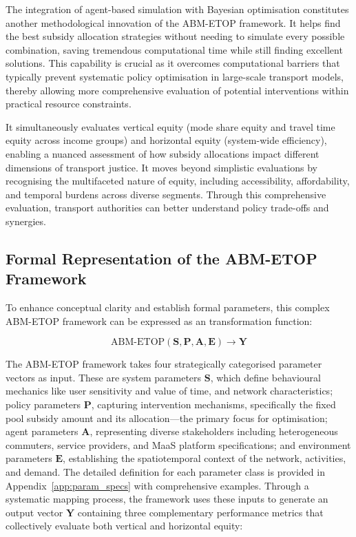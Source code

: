 \documentclass[a4paper,fleqn]{cas-sc}
\begin{document}
The integration of agent-based simulation with Bayesian optimisation constitutes another methodological innovation of the ABM-ETOP framework. It helps find the best subsidy allocation strategies without needing to simulate every possible combination, saving tremendous computational time while still finding excellent solutions. This capability is crucial as it overcomes computational barriers that typically prevent systematic policy optimisation in large-scale transport models, thereby allowing more comprehensive evaluation of potential interventions within practical resource constraints.

It simultaneously evaluates vertical equity (mode share equity and travel time equity across income groups) and horizontal equity (system-wide efficiency), enabling a nuanced assessment of how subsidy allocations impact different dimensions of transport justice. It moves beyond simplistic evaluations by recognising the multifaceted nature of equity, including accessibility, affordability, and temporal burdens across diverse segments. Through this comprehensive evaluation, transport authorities can better understand policy trade-offs and synergies.

\subsection{Formal Representation of the ABM-ETOP Framework}\label{sec:simpleformula}

To enhance conceptual clarity and establish formal parameters, this complex ABM-ETOP framework can be expressed as an transformation function:

\begin{equation}
\text{ABM-ETOP}(\mathbf{S}, \mathbf{P}, \mathbf{A}, \mathbf{E}) \rightarrow \mathbf{Y}
\end{equation}

The ABM-ETOP framework takes four strategically categorised parameter vectors as input. These are system parameters $\mathbf{S}$, which define behavioural mechanics like user sensitivity and value of time, and network characteristics; policy parameters $\mathbf{P}$, capturing intervention mechanisms, specifically the fixed pool subsidy amount and its allocation—the primary focus for optimisation; agent parameters $\mathbf{A}$, representing diverse stakeholders including heterogeneous commuters, service providers, and MaaS platform specifications; and environment parameters $\mathbf{E}$, establishing the spatiotemporal context of the network, activities, and demand. The detailed definition for each parameter class is provided in Appendix~\ref{app:param_specs} with comprehensive examples. 
Through a systematic mapping process, the framework uses these inputs to generate an output vector $\mathbf{Y}$ containing three complementary performance metrics that collectively evaluate both vertical and horizontal equity:
\end{document}
